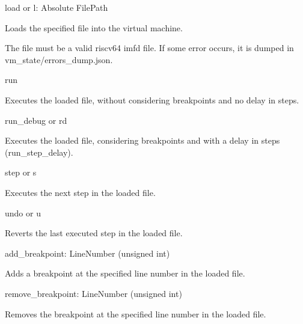 
\begin{DoxyItemize}
\item {\ttfamily load} or {\ttfamily l}\+: {\ttfamily Absolute File\+Path} ~\newline

\begin{DoxyItemize}
\item Loads the specified file into the virtual machine.
\item The file must be a valid riscv64 imfd file. If some error occurs, it is dumped in {\ttfamily vm\+\_\+state/errors\+\_\+dump.\+json}.
\end{DoxyItemize}
\item {\ttfamily run}
\begin{DoxyItemize}
\item Executes the loaded file, without considering breakpoints and no delay in steps.
\end{DoxyItemize}
\item {\ttfamily run\+\_\+debug} or {\ttfamily rd}
\begin{DoxyItemize}
\item Executes the loaded file, considering breakpoints and with a delay in steps (run\+\_\+step\+\_\+delay).
\end{DoxyItemize}
\item {\ttfamily step} or {\ttfamily s}
\begin{DoxyItemize}
\item Executes the next step in the loaded file.
\end{DoxyItemize}
\item {\ttfamily undo} or {\ttfamily u}
\begin{DoxyItemize}
\item Reverts the last executed step in the loaded file.
\end{DoxyItemize}
\item {\ttfamily add\+\_\+breakpoint}\+: {\ttfamily Line\+Number} (unsigned int)
\begin{DoxyItemize}
\item Adds a breakpoint at the specified line number in the loaded file.
\end{DoxyItemize}
\item {\ttfamily remove\+\_\+breakpoint}\+: {\ttfamily Line\+Number} (unsigned int)
\begin{DoxyItemize}
\item Removes the breakpoint at the specified line number in the loaded file.
\end{DoxyItemize}

\end{DoxyItemize}
